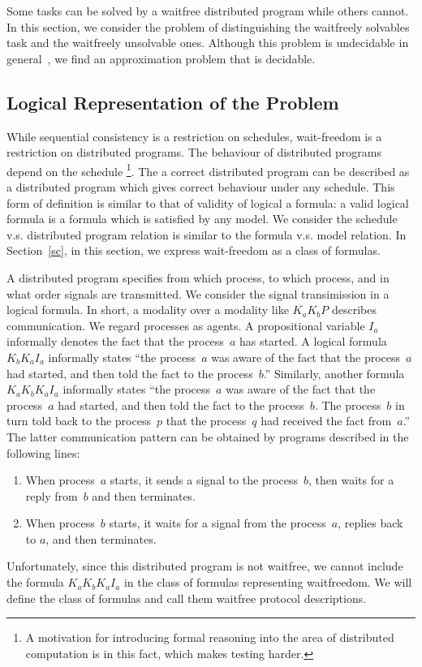 Some tasks can be solved by a waitfree distributed program while others cannot.
In this section, we consider the problem of
distinguishing the waitfreely solvables task and the waitfreely unsolvable ones.
Although this problem is undecidable in general~\cite{gafni1999three},
we find an approximation problem that is decidable.

\subsection{Logical Representation of the Problem}

While sequential consistency is a restriction on schedules,
wait-freedom is a restriction on distributed programs.
The behaviour of distributed programs depend on the schedule%
\footnote{A motivation for introducing formal reasoning into the area of distributed
computation is in this fact, which makes testing harder.}.
The a correct distributed program can be described as
a distributed program which gives correct behaviour under any schedule.
This form of definition is similar to that of validity of logical a formula:
a valid logical formula is a formula which is satisfied by any model.
We consider the schedule v.s. distributed program relation is similar to
the formula v.s. model relation.
In Section~\ref{sc},
in this section, we express wait-freedom as a class of formulas.

A distributed program specifies
from which process, to which process, and in what order
signals are transmitted.
We consider the signal transimission in a logical formula.
In short, a modality over a modality like $K_a K_b P$ describes communication.
We regard processes as agents.
A propositional variable $I_a$ informally denotes the fact that the process~$a$ has
started.
A logical formula $K_b K_a I_a$ informally states
``the process~$a$ was aware of the fact that the process~$a$ had started,
and then told the fact to the process~$b$.''
Similarly, another formula $K_a K_b K_a I_a$ informally states
``the process~$a$ was aware of the fact that the process~$a$ had started,
and then told the fact to the process~$b$. The process~$b$ in turn told back to the
process~$p$ that the process~$q$ had received the fact from~$a$.''
The latter communication pattern can be obtained by programs described in the following lines:
\begin{enumerate}
 \item When process~$a$ starts, it sends a signal to the process~$b$, then waits for a
       reply from~$b$ and then terminates.
 \item When process~$b$ starts, it waits for a signal from the process~$a$,
       replies back to $a$, and then terminates.
\end{enumerate}
Unfortunately,
since this distributed program is not waitfree,
we cannot include the formula
$K_a K_b K_a I_a$
in the class of formulas representing waitfreedom.
We will define the class of formulas and call them waitfree protocol descriptions.

